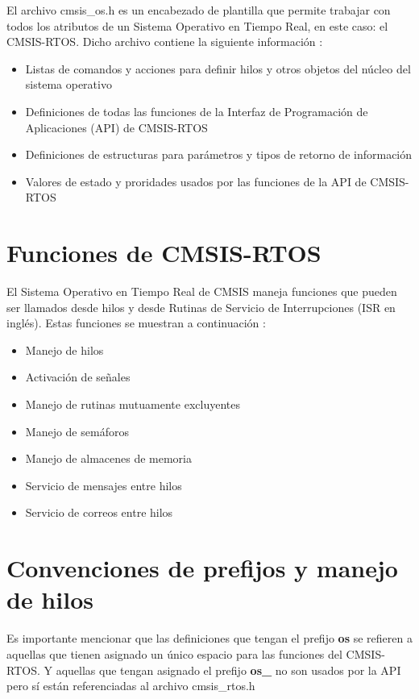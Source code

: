 \documentclass[12pt, twoside]{report}
\begin{document}
El archivo cmsis\_os.h es un encabezado de plantilla que permite trabajar con todos los atributos de un Sistema Operativo en Tiempo Real, en este caso: el CMSIS-RTOS. Dicho archivo contiene la siguiente información  \cite{Keil}: 
\begin{itemize}
	\item Listas de comandos y acciones para definir hilos y otros objetos del núcleo del sistema operativo
	\item Definiciones de todas las funciones de la Interfaz de Programación de Aplicaciones (API)  de CMSIS-RTOS
	\item Definiciones de estructuras para parámetros y tipos de retorno de información
	\item Valores de estado y proridades usados por las funciones de la API de CMSIS-RTOS
\end{itemize}

\section{Funciones de CMSIS-RTOS}

El Sistema Operativo en Tiempo Real de CMSIS maneja funciones que pueden ser llamados desde hilos y desde Rutinas de Servicio de Interrupciones (ISR en inglés). Estas funciones se muestran a continuación \cite{Keil}:

\begin{itemize}
	\item Manejo de hilos
	\item Activación de señales
	\item Manejo de rutinas mutuamente excluyentes
	\item Manejo de semáforos
	\item Manejo de almacenes de memoria 
	\item Servicio de mensajes entre hilos
	\item Servicio de correos entre hilos
\end{itemize} 

\section{Convenciones de prefijos y manejo de hilos}

Es importante mencionar que las definiciones que tengan el prefijo \textbf{os} se refieren a aquellas que tienen asignado un único espacio para las funciones del CMSIS-RTOS. Y aquellas que tengan asignado el prefijo \textbf{os\_} no son usados por la API pero sí están referenciadas al archivo cmsis\_rtos.h 
\end{document}
